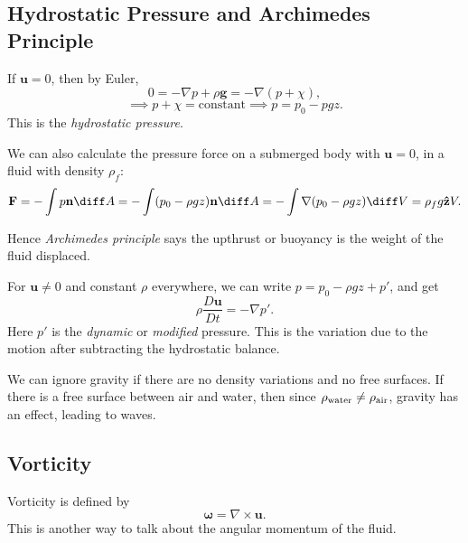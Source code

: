 \documentclass[12pt]{article}
\begin{document}
\subsection{Hydrostatic Pressure and Archimedes Principle}
\label{sub:hydrostatic_pressure_and_archimedes_principle}

If $\mathbf{u} = 0$, then by Euler,
\[
0 = - \nabla p + \rho \mathbf{g} = - \nabla (p + \chi)
,\]
\[
	\implies p + \chi = \mathrm{constant} \implies p = p_0 - pgz
.\]
This is the \emph{hydrostatic pressure}.

We can also calculate the pressure force on a submerged body with $\mathbf{u} = 0$, in a fluid with density $\rho_{f}$:
\begin{align*}
	\mathbf{F} = - \int p \mathbf{n} \diff A = - \int (p_0 - \rho g z) \mathbf{n} \diff A = - \int \nabla (p_0 - \rho g z) \diff V = \rho_{f} g \mathbf{\hat z} V.
\end{align*}

Hence \emph{Archimedes principle} says the upthrust or buoyancy is the weight of the fluid displaced.

For $\mathbf{u} \neq 0$ and constant $\rho$ everywhere, we can write $p = p_0 - \rho g z + p'$, and get
\[
\rho \frac{D \mathbf{u}}{D t} = - \nabla p'
.\]
Here $p'$ is the \emph{dynamic} or \emph{modified} pressure. This is the variation due to the motion after subtracting the hydrostatic balance.

We can ignore gravity if there are no density variations and no free surfaces. If there is a free surface between air and water, then since $\rho_{\rm{water}} \neq \rho_{\rm{air}}$, gravity has an effect, leading to waves.

\subsection{Vorticity}
\label{sub:vorticity}

Vorticity is defined by
\[
\bm{\omega} = \nabla \times \mathbf{u}
.\]
This is another way to talk about the angular momentum of the fluid.
\end{document}
